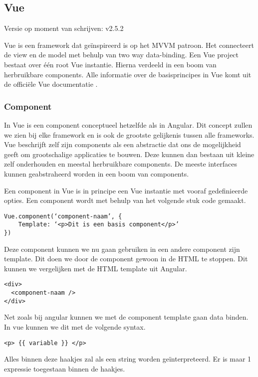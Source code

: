 \subsection{Vue}
\label{sec:JavaScript_Frameworks_Vue}
Versie op moment van schrijven: v2.5.2

Vue is een framework dat geïnspireerd is op het MVVM patroon. Het connecteert de view en de model met behulp van two way data-binding. Een Vue project bestaat over één root Vue instantie. Hierna verdeeld in een boom van herbruikbare components.
Alle informatie over de basisprincipes in Vue komt uit de officiële Vue documentatie \autocite{_vue_2018}.

\subsubsection{Component}
\label{sec:Vue_Component}
In Vue is een component conceptueel hetzelfde als in Angular. Dit concept zullen we zien bij elke framework en is ook de grootste gelijkenis tussen alle frameworks. Vue beschrijft zelf zijn components als een abstractie dat ons de mogelijkheid geeft om grootschalige applicaties te bouwen. Deze kunnen dan bestaan uit kleine zelf onderhouden en meestal herbruikbare components. De meeste interfaces kunnen geabstraheerd worden in een boom van components.

Een component in Vue is in principe een Vue instantie met vooraf gedefinieerde opties. Een component wordt met behulp van het volgende stuk code gemaakt.

\begin{verbatim}
Vue.component(‘component-naam’, {
	Template: ‘<p>Dit is een basis component</p>’
})
\end{verbatim}

Deze component kunnen we nu gaan gebruiken in een andere component zijn template. Dit doen we door de component gewoon in de HTML te stoppen. Dit kunnen we vergelijken met de HTML template uit Angular.

\begin{verbatim}
<div>
  <component-naam />
</div>
\end{verbatim}

Net zoals bij angular kunnen we met de component template gaan data binden. In vue kunnen we dit met de volgende syntax.

\begin{verbatim}
<p> {{ variable }} </p>
\end{verbatim}

Alles binnen deze haakjes zal als een string worden geïnterpreteerd. Er is maar 1 expressie toegestaan binnen de haakjes. 


